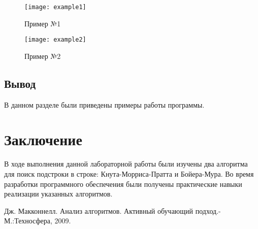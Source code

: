 \documentclass[a4paper, 14pt]{article}
\begin{document}
	\begin{figure}[H]
        	\begin{center}
        		{\texttt{[image: example1]}}
        		\caption{Пример №1}
        	\end{center}
        \end{figure}

\begin{figure}[H]
        	\begin{center}
        		{\texttt{[image: example2]}}
        		\caption{Пример №2}
        	\end{center}
        \end{figure}

	\subsection{Вывод}
	
	В данном разделе были приведены примеры работы программы.

	\newpage
	\section*{Заключение}
	
	В ходе выполнения данной лабораторной работы были изучены два алгоритма для поиск подстроки в строке: Кнута-Морриса-Пратта и Бойера-Мура. Во время разработки программного обеспечения были получены практические навыки реализации указанных алгоритмов.
	
\newpage
{}

\begin{thebibliography}{}
      Дж. Макконнелл. Анализ алгоритмов. Активный обучающий подход.-М.:Техносфера, 2009.
\end{thebibliography}
	
	\newpage
	
	
	
\end{document}
